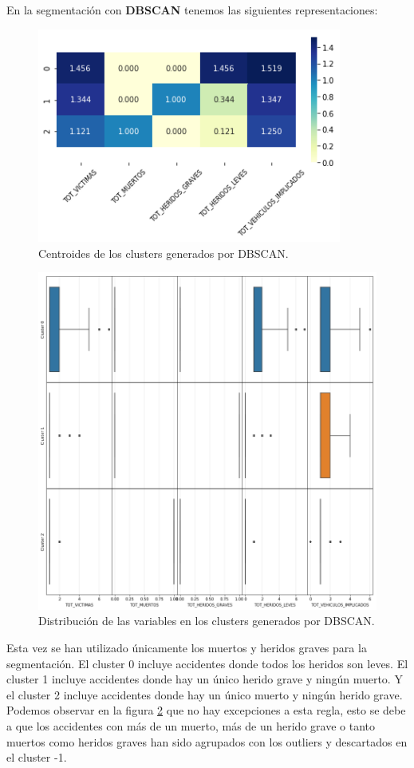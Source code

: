 \documentclass[oneside]{book}
\begin{document}
En la segmentación con \textbf{DBSCAN} tenemos las siguientes representaciones:

\begin{figure}[H]
  \centering
  \includegraphics[width=100mm]{figures/accidentes/dbscan1centroids}
  \caption{Centroides de los clusters generados por DBSCAN.}
  \label{fig:dbscan1centroids}
\end{figure}

\begin{figure}[H]
  \centering
  \includegraphics[width=120mm]{figures/accidentes/dbscan1distribution}
  \caption{Distribución de las variables en los clusters generados por
    DBSCAN.}
  \label{fig:dbscan1distribution}
\end{figure}

Esta vez se han utilizado únicamente los muertos y heridos graves para
la segmentación. El cluster 0 incluye accidentes donde todos los
heridos son leves. El cluster 1 incluye accidentes donde hay un único
herido grave y ningún muerto. Y el cluster 2 incluye accidentes donde
hay un único muerto y ningún herido grave. Podemos observar en la
figura \ref{fig:dbscan1distribution} que no hay excepciones a esta
regla, esto se debe a que los accidentes con más de un muerto, más de
un herido grave o tanto muertos como heridos graves han sido agrupados
con los outliers y descartados en el cluster -1.
\end{document}
